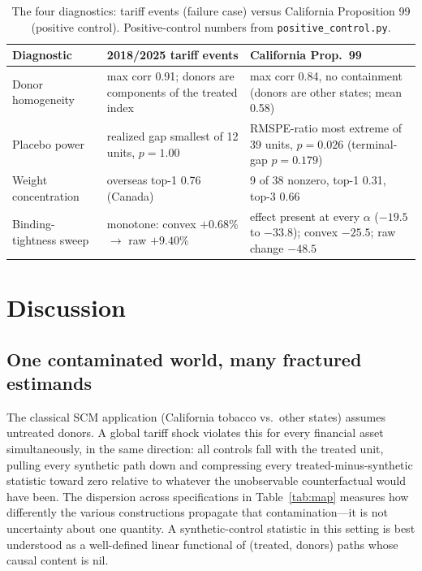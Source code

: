 \documentclass[11pt,a4paper]{article}
\begin{document}
\begin{table}[htbp]
\centering
\caption{The four diagnostics: tariff events (failure case) versus
California Proposition 99 (positive control). Positive-control numbers
from \texttt{positive\_control.py}.}
\label{tab:poscontrol}
\small
\setlength{\tabcolsep}{4pt}
\begin{tabular}{@{}p{2.9cm}p{5.4cm}p{5.7cm}@{}}
\toprule
Diagnostic & 2018/2025 tariff events & California Prop.\ 99 \\
\midrule
Donor homogeneity & max corr 0.91; donors are components of the treated
index & max corr 0.84, no containment (donors are other states; mean
0.58) \\
Placebo power & realized gap smallest of 12 units, $p=1.00$ & RMSPE-ratio
most extreme of 39 units, $p=0.026$ (terminal-gap $p=0.179$) \\
Weight concentration & overseas top-1 0.76 (Canada) & 9 of 38 nonzero,
top-1 0.31, top-3 0.66 \\
Binding-tightness sweep & monotone: convex $+0.68\%$ $\to$ raw
$+9.40\%$ & effect present at every $\alpha$ ($-19.5$ to $-33.8$);
convex $-25.5$; raw change $-48.5$ \\
\bottomrule
\end{tabular}
\end{table}

\section{Discussion}\label{sec:discussion}

\subsection{One contaminated world, many fractured estimands}
\label{sec:estimands}

The classical SCM application (California tobacco vs.\ other states)
assumes untreated donors. A global tariff shock violates this for every
financial asset simultaneously, in the same direction: all controls fall
with the treated unit, pulling every synthetic path down and compressing
every treated-minus-synthetic statistic toward zero relative to whatever
the unobservable counterfactual would have been. The dispersion across
specifications in Table~\ref{tab:map} measures how differently the various
constructions propagate that contamination---it is not uncertainty about
one quantity. A synthetic-control statistic in this setting is best
understood as a well-defined linear functional of (treated, donors)
paths whose causal content is nil.
\end{document}
